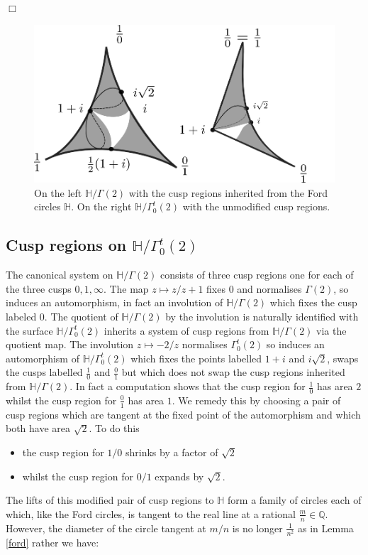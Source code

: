 \documentclass[12pt,a4paper]{amsart}
\def\HH{\mathbb{H}}
\def\g2{\Gamma(2)}
\def\ah{\Gamma_0^t(2)}
\def\oot{\HH / \ah}
\def\xx{\HH/\g2}
\begin{document}
\hfill $\Box$

  \begin{figure}[H]
	  \label{cusp regions}
\begin{center}
\includegraphics[scale=.5]{hecke_cover.png} 
\end{center}
\caption{On the left $\xx$ with the cusp regions inherited from the
Ford circles  $\mathbb{H}$.
On the right $\oot$ with the unmodified cusp regions.}
\end{figure}
\subsection{Cusp regions  on $\oot$}

The canonical system on $\xx$ consists of three cusp regions 
one for each of the three cusps $0,1,\infty$.
The map $z\mapsto z/z+1$ fixes $0$ and normalises $\g2$,
so induces an automorphism, in fact an involution of $\xx$ which
fixes the cusp labeled $0$.
The quotient of $\xx$ by the involution is naturally identified with
the surface $\oot$
inherits a system of cusp regions from $\xx$ via the quotient map.
The involution $z\mapsto -2/z$ normalises $\ah$ so induces an
automorphism of $\oot$ which fixes the points labelled
$1+i$ and $i\sqrt 2$, swaps the cusps labelled
$\frac{1}{0}$ and
$\frac{0}{1}$ but which does not swap the cusp regions inherited
from $\xx$.
In fact a computation shows that the cusp region for $\frac{1}{0}$ has
area $2$ whilst the cusp region for $\frac{0}{1}$ has area $1$.
We remedy this by choosing a pair of cusp regions which are tangent
at the fixed point of the automorphism and which both have area $\sqrt 2$.
To do this 
\begin{itemize}
\item the cusp region for $1/0$ shrinks by a factor of
$\sqrt 2$ 
\item whilst the cusp region for $0/1$ expands by $\sqrt 2$.
\end{itemize}
The lifts of this modified pair of cusp regions to $\HH$ form a family of circles each of which, like the Ford
circles, is tangent to the real line at a rational
$\frac{m}{n}\in \mathbb{Q}$.
However, the diameter of the circle tangent at $m/n$ is no longer
$\frac{1}{n^2}$ as in Lemma \ref{ford} rather we have:
\end{document}
